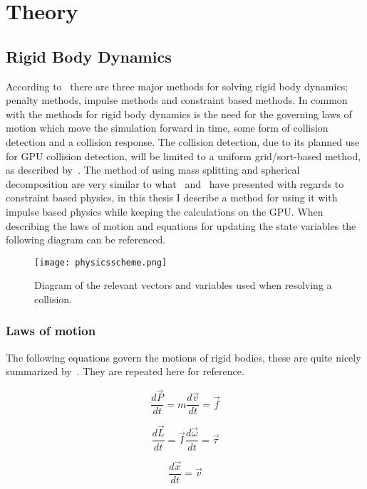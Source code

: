 \chapter{Theory}\label{cha:theory}
\section{Rigid Body Dynamics}
According to~\cite{baberrigid} there are three major methods for solving rigid body
dynamics; penalty methods, impulse methods and constraint based methods.
In common with the methods for rigid body dynamics is the need for the governing laws of
motion which move the simulation forward in time, some form of collision detection
and a collision response. The collision detection, due to its planned use for GPU collision
detection, will be limited to a uniform grid/sort-based method, as described by~\cite{gpugems}.
The method of using mass splitting and spherical decomposition are very similar
to what~\cite{flex} and~\cite{bulletPipeline} have presented with regards to
constraint based physics, in this thesis I describe a method for using it with
impulse based physics while keeping the calculations on the GPU. When describing the laws of motion and equations
for updating the state variables the following diagram can be referenced.

\begin{figure}[H]
  \centering
  \texttt{[image: physicsscheme.png]}
  \caption{Diagram of the relevant vectors and variables used when resolving a collision.}
  \label{fig:diag}
\end{figure}

\subsection{Laws of motion}
The following equations govern the motions of rigid bodies, these are quite
nicely summarized by~\cite{hansson}. They are repeated here for reference.

\begin{equation}
  \frac{d\vec{P}}{dt}=m\frac{d\vec{v}}{dt} = \vec{f}
\end{equation}

\begin{equation}
  \frac{d\vec{L}}{dt}=\vec{I}\frac{d\vec{\omega}}{dt} = \vec{\tau}
\end{equation}

\begin{equation}
  \frac{d\vec{x}}{dt}=\vec{v}
\end{equation}

